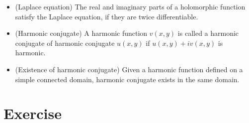\begin{itemize}
\item (Laplace equation) 	The real and imaginary parts of a holomorphic function satisfy the Laplace equation, if they are twice differentiable.

	\item (Harmonic conjugate)  A harmonic function $v(x,y)$ is called a harmonic conjugate of harmonic conjugate $u(x,y)$ if $u(x,y)+iv(x,y)$ is harmonic.
	
	
	\item (Existence of harmonic conjugate) 
	Given a harmonic function defined on a simple connected domain, harmonic conjugate exists in the same domain.
\end{itemize}

\section*{Exercise}

